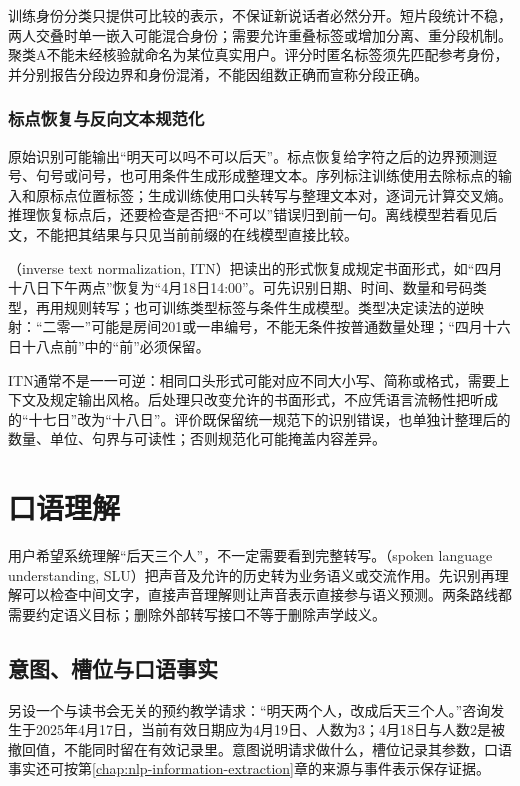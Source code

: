 训练身份分类只提供可比较的表示，不保证新说话者必然分开。短片段统计不稳，两人交叠时单一嵌入可能混合身份；需要允许重叠标签或增加分离、重分段机制。聚类A不能未经核验就命名为某位真实用户。评分时匿名标签须先匹配参考身份，并分别报告分段边界和身份混淆，不能因组数正确而宣称分段正确。

\subsubsection{标点恢复与反向文本规范化}
\label{sec:nlp-speech-itn}

原始识别可能输出“明天可以吗不可以后天”。标点恢复给字符之后的边界预测逗号、句号或问号，也可用条件生成形成整理文本。序列标注训练使用去除标点的输入和原标点位置标签；生成训练使用口头转写与整理文本对，逐词元计算交叉熵。推理恢复标点后，还要检查是否把“不可以”错误归到前一句。离线模型若看见后文，不能把其结果与只见当前前缀的在线模型直接比较。

（inverse text normalization, ITN）把读出的形式恢复成规定书面形式，如“四月十八日下午两点”恢复为“4月18日14:00”。可先识别日期、时间、数量和号码类型，再用规则转写；也可训练类型标签与条件生成模型。类型决定读法的逆映射：“二零一”可能是房间201或一串编号，不能无条件按普通数量处理；“四月十六日十八点前”中的“前”必须保留。

ITN通常不是一一可逆：相同口头形式可能对应不同大小写、简称或格式，需要上下文及规定输出风格。后处理只改变允许的书面形式，不应凭语言流畅性把听成的“十七日”改为“十八日”。评价既保留统一规范下的识别错误，也单独计整理后的数量、单位、句界与可读性；否则规范化可能掩盖内容差异。

\section{口语理解}
\label{sec:nlp-speech-understanding}

用户希望系统理解“后天三个人”，不一定需要看到完整转写。（spoken language understanding, SLU）把声音及允许的历史转为业务语义或交流作用。先识别再理解可以检查中间文字，直接声音理解则让声音表示直接参与语义预测。两条路线都需要约定语义目标；删除外部转写接口不等于删除声学歧义。

\subsection{意图、槽位与口语事实}
\label{sec:nlp-speech-semantics}

另设一个与读书会无关的预约教学请求：“明天两个人，改成后天三个人。”咨询发生于2025年4月17日，当前有效日期应为4月19日、人数为3；4月18日与人数2是被撤回值，不能同时留在有效记录里。意图说明请求做什么，槽位记录其参数，口语事实还可按第\ref{chap:nlp-information-extraction}章的来源与事件表示保存证据。

